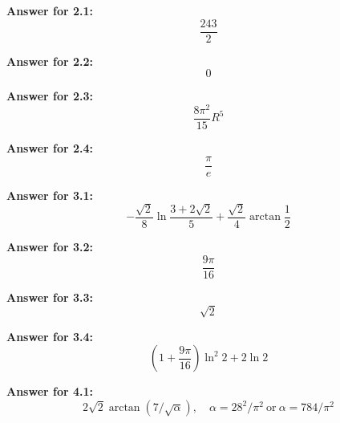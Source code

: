 \documentclass[12pt]{article}
\begin{document}
\par \textbf{Answer for 2.1: }
\begin{equation*}
    \frac{243}{2}
\end{equation*}

\par \textbf{Answer for 2.2: }
\begin{equation*}
    0
\end{equation*}

\par \textbf{Answer for 2.3: }
\begin{equation*}
    \frac{8\pi^2}{15}R^5
\end{equation*}

\par \textbf{Answer for 2.4: }
\begin{equation*}
    \frac{\pi}{e}
\end{equation*}


\par \textbf{Answer for 3.1: }
\begin{equation*}
    -\frac{\sqrt{2}}{8}\ln \frac{3+2\sqrt{2}}{5}+\frac{\sqrt{2}}{4}\arctan \frac{1}{2}
\end{equation*}

\par \textbf{Answer for 3.2: }
\begin{equation*}
    \frac{9\pi}{16}
\end{equation*}

\par \textbf{Answer for 3.3: }
\begin{equation*}
    \sqrt{2}
\end{equation*}

\par \textbf{Answer for 3.4: }
\begin{equation*}
    \left(1+\frac{9\pi}{16}\right)\ln^2 2 + 2\ln 2
\end{equation*}


\par \textbf{Answer for 4.1: }
\begin{equation*}
        2\sqrt{2}\arctan(7/\sqrt{\alpha}), \quad \alpha = 28^2/\pi^2\ \text{or}\ \alpha = 784/\pi^2
\end{equation*}
\end{document}
